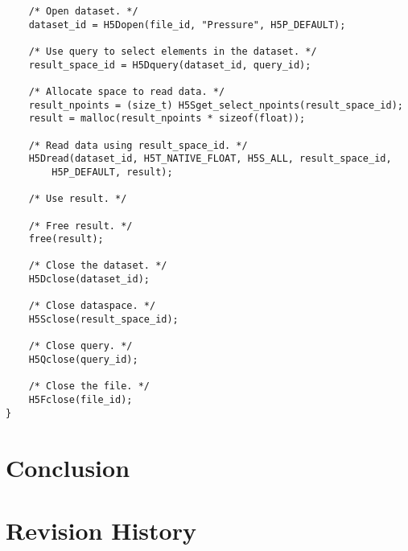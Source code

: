\documentclass[letterpaper,hyper]{THG_RFC}
\begin{document}
{\begin{lstlisting}
    /* Open dataset. */
    dataset_id = H5Dopen(file_id, "Pressure", H5P_DEFAULT);

    /* Use query to select elements in the dataset. */
    result_space_id = H5Dquery(dataset_id, query_id);

    /* Allocate space to read data. */ 
    result_npoints = (size_t) H5Sget_select_npoints(result_space_id);
    result = malloc(result_npoints * sizeof(float));

    /* Read data using result_space_id. */
    H5Dread(dataset_id, H5T_NATIVE_FLOAT, H5S_ALL, result_space_id,
        H5P_DEFAULT, result);

    /* Use result. */

    /* Free result. */
    free(result);

    /* Close the dataset. */
    H5Dclose(dataset_id);

    /* Close dataspace. */
    H5Sclose(result_space_id);

    /* Close query. */
    H5Qclose(query_id);

    /* Close the file. */
    H5Fclose(file_id);
}
\end{lstlisting}
}

\section{Conclusion}

\section*{Revision History}
\makerevisions



\end{document}
